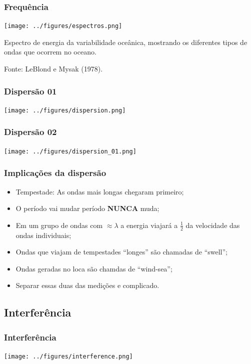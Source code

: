 \begin{frame}
\frametitle{Frequência}
  \begin{center}
    \texttt{[image: ../figures/espectros.png]}
  \end{center}

  {\tiny Espectro de energia da variabilidade oceânica, mostrando os diferentes
         tipos de ondas que ocorrem no oceano.}

  {\tiny Fonte: LeBlond e Mysak (1978).}
\end{frame}



\begin{frame}
\frametitle{Dispersão 01}
\begin{center}
  \texttt{[image: ../figures/dispersion.png]}
\end{center}
\end{frame}


\begin{frame}
\frametitle{Dispersão 02}
\begin{center}
  \texttt{[image: ../figures/dispersion\_01.png]}
\end{center}
\end{frame}


\begin{frame}
\frametitle{Implicações da dispersão}
  {\small
  \begin{itemize}[<+-| alert@+>]
    \item Tempestade: As ondas mais longas chegaram primeiro;
    \item O período vai mudar período {\bf NUNCA} muda;
    \item Em um grupo de ondas com $\approx \lambda$ a energia viajará a
          $\frac{1}{2}$ da velocidade das ondas individuais;
    \item Ondas que viajam de tempestades ``longes'' são chamadas de ``swell'';
    \item Ondas geradas no loca são chamdas de ``wind-sea'';
    \item Separar essas duas das medições e complicado.
  \end{itemize}
  }
\end{frame}


\subsection{Interferência}
\begin{frame}
\frametitle{Interferência}
\begin{center}
  \texttt{[image: ../figures/interference.png]}
\end{center}
\end{frame}


